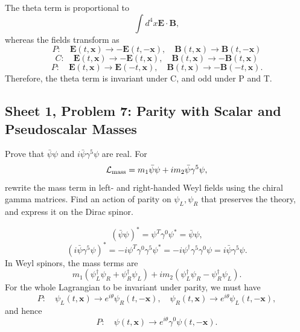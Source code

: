 \begin{solution}
    The theta term is proportional to
    \begin{equation}
        \int d^4x \mathbf{E}\cdot \mathbf{B},
    \end{equation}
    whereas the fields transform as
    \begin{equation}
        P:\quad \mathbf{E}(t,\mathbf{x}) \to -\mathbf{E}(t,-\mathbf{x}), \quad \mathbf{B}(t,\mathbf{x}) \to \mathbf{B}(t,-\mathbf{x})
    \end{equation}
    \begin{equation}
        C:\quad \mathbf{E}(t,\mathbf{x}) \to -\mathbf{E}(t,\mathbf{x}), \quad \mathbf{B}(t,\mathbf{x}) \to - \mathbf{B}(t,\mathbf{x})
    \end{equation}
    \begin{equation}
        P:\quad \mathbf{E}(t,\mathbf{x}) \to \mathbf{E}(-t,\mathbf{x}), \quad \mathbf{B}(t,\mathbf{x}) \to - \mathbf{B}(-t,\mathbf{x}).
    \end{equation}
    Therefore, the theta term is invariant under C, and odd under P and T.
\end{solution}

\subsection{Sheet 1, Problem 7: Parity with Scalar and Pseudoscalar Masses}

Prove that $\bar\psi\psi$ and $i\bar\psi\gamma^5\psi$ are real.
For
\begin{equation}
    \mathcal L_{\rm mass}
    =m_1\bar\psi\psi+im_2\bar\psi\gamma^5\psi,
\end{equation}
rewrite the mass term in left- and right-handed Weyl fields using the
chiral gamma matrices. Find an action of parity on $\psi_L,\psi_R$
that preserves the theory, and express it on the Dirac spinor.
\begin{solution}
    \begin{equation}
        (\bar\psi \psi)^* = \psi^T\gamma^0 \psi^* = \bar \psi \psi,
    \end{equation}
    \begin{equation}
        (i\bar \psi \gamma^5 \psi)^* = -i\psi^T \gamma^0 \gamma^5 \psi^* =  - i\psi^\dagger \gamma^5\gamma^0 \psi = i \bar \psi \gamma^5 \psi.
    \end{equation}
    In Weyl spinors, the mass terms are
    \begin{equation}
        m_1(\psi_L^\dagger\psi_R + \psi_R^\dagger \psi_L) + im_2(\psi_L^\dagger\psi_R - \psi_R^\dagger \psi_L).
    \end{equation}
    For the whole Lagrangian to be invariant under parity, we must have
    \begin{equation}
        P :\quad \psi_L(t,\mathbf{x}) \to e^{i\theta}\psi _R (t,-\mathbf{x}), \quad\psi_R(t,\mathbf{x}) \to e^{i\theta}\psi _L (t,-\mathbf{x}),
    \end{equation}
    and hence
    \begin{equation}
        P :\quad \psi(t,\mathbf{x}) \to e^{i\theta}\gamma^0\psi (t,-\mathbf{x}).
    \end{equation}
\end{solution}

